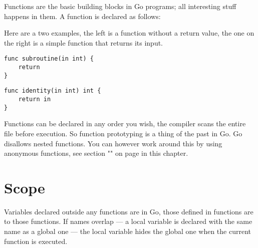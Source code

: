 
\noindent{}Functions are the basic building blocks in Go programs; all interesting
stuff happens in them. A function is declared as follows:

\showremarks
Here are a two examples, the left is a function without a return value,
the one on the right is a simple function that returns its input.

\begin{minipage}{.5\textwidth}
\begin{lstlisting}
func subroutine(in int) {
    return
}
\end{lstlisting}
\end{minipage}
\begin{minipage}{.5\textwidth}
\begin{lstlisting}
func identity(in int) int {
    return in
}
\end{lstlisting}
\end{minipage}

Functions can be declared in any order you wish, the compiler scans the
entire file before execution. So function prototyping is a thing of the
past in Go.
Go disallows nested functions.
You can however
work around this by using anonymous functions, see section
"" on page \pageref{sec:functions as values} 
in this chapter.

\section{Scope}
Variables declared outside any functions are  in Go, those
defined in functions are  to those functions. If names overlap --- a
local variable is declared with the same name as a global one --- the
local variable hides the global one when the current function is
executed.

\begin{minipage}{.5\textwidth}

\hfill
\vfill
\end{minipage}
\hfill
\begin{minipage}{.5\textwidth}

\hfill
\vfill
\end{minipage}

